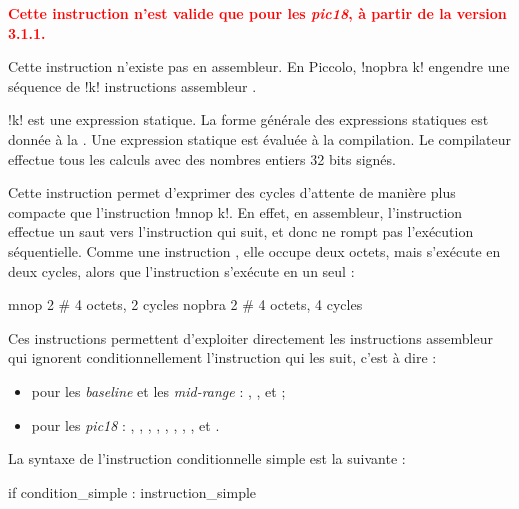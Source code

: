 
\textcolor{red}{\bf Cette instruction n'est valide que pour les \emph{pic18}, à partir de la version 3.1.1.}

Cette instruction n'existe pas en assembleur. En Piccolo, \pic!nopbra k! engendre une séquence de \pic!k! instructions assembleur .

\pic!k! est une expression statique. La forme générale des expressions statiques est donnée à la . Une expression statique est évaluée à la compilation. Le compilateur effectue tous les calculs avec des nombres entiers 32 bits signés.

Cette instruction permet d'exprimer des cycles d'attente de manière plus compacte que l'instruction \pic!mnop k!. En effet, en assembleur, l'instruction  effectue un saut vers l'instruction qui suit, et donc ne rompt pas l'exécution séquentielle. Comme une instruction , elle occupe deux octets, mais s'exécute en deux cycles, alors que l'instruction  s'exécute en un seul :

\begin{piccolo}
mnop 2   # 4 octets, 2 cycles
nopbra 2 # 4 octets, 4 cycles
\end{piccolo}







Ces instructions permettent d'exploiter directement les instructions assembleur qui ignorent conditionnellement l'instruction qui les suit, c'est à dire :
\begin{itemize}
\item pour les \emph{baseline} et les \emph{mid-range} : , ,  et  ;
\item pour les \emph{pic18} : , , , , , , , ,  et .
\end{itemize}

La syntaxe de l'instruction conditionnelle simple est la suivante :

\begin{piccolo}
if condition_simple : instruction_simple
\end{piccolo}

